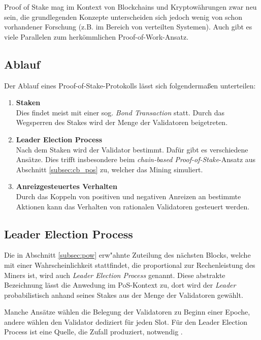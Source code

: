 Proof of Stake mag im Kontext von Blockchains und Kryptowährungen zwar neu sein, die grundlegenden Konzepte unterscheiden sich jedoch wenig von schon vorhandener Forschung (z.B. im Bereich von verteilten Systemen). Auch gibt es viele Parallelen zum herkömmlichen Proof-of-Work-Ansatz.

\subsection{Ablauf}

Der Ablauf eines Proof-of-Stake-Protokolls lässt sich folgendermaßen unterteilen:

\begin{enumerate}
\item \textbf{Staken}\\
Dies findet meist mit einer sog. \textit{Bond Transaction} statt. Durch das Wegsperren des Stakes wird der Menge der Validatoren beigetreten.

\item \textbf{Leader Election Process}\\
Nach dem Staken wird der Validator bestimmt. Dafür gibt es verschiedene Ansätze. Dies trifft insbesondere beim \textit{chain-based Proof-of-Stake}-Ansatz aus Abschnitt \ref{subsec:cb_pos} zu, welcher das Mining simuliert.

\item \textbf{Anreizgesteuertes Verhalten}\\
Durch das Koppeln von positiven und negativen Anreizen an bestimmte Aktionen kann das Verhalten von rationalen Validatoren gesteuert werden.  
\end{enumerate}

\subsection{Leader Election Process}

Die in Abschnitt \ref{subsec:pow} erw"ahnte Zuteilung des nächsten Blocks, welche mit einer Wahrscheinlichkeit stattfindet, die proportional zur Rechenleistung des Miners ist, wird auch \textit{Leader Election Process} genannt. 
Diese abstrakte Bezeichnung lässt die Anwedung im PoS-Kontext zu, dort wird der \textit{Leader} probabilistisch anhand seines Stakes aus der Menge der Validatoren gewählt.

Manche Ansätze wählen die Belegung der Validatoren zu Beginn einer Epoche, andere wählen den Validator dediziert für jeden Slot.
Für den Leader Election Process ist eine Quelle, die Zufall produziert, notwendig \cite[S. 1ff.]{ouroboros}.

